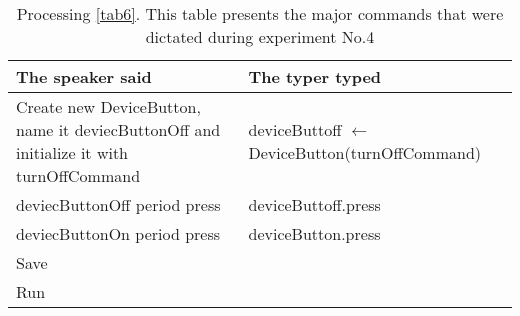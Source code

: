 \begin{table}[H]
	\begin{tabular}{|p{10cm}|p{6cm}|}
		\hline
		\rowcolor[HTML]{9B9B9B} 
		{\color[HTML]{000000} The speaker said} & {\color[HTML]{000000} The typer typed} \\ \hline
		Create new DeviceButton, name it deviecButtonOff and initialize it with turnOffCommand & deviceButtoff $\leftarrow$ DeviceButton(turnOffCommand) \\ \hline
		deviecButtonOff period press & deviceButtoff.press \\ \hline
		deviecButtonOn period press & deviceButton.press \\ \hline
		Save & \\ \hline
		Run & \\ \hline
	\end{tabular}
	\caption{Processing \autoref{tab6}. This table presents the major commands that were dictated during experiment No.4}
	\label{tab7}
\end{table}

